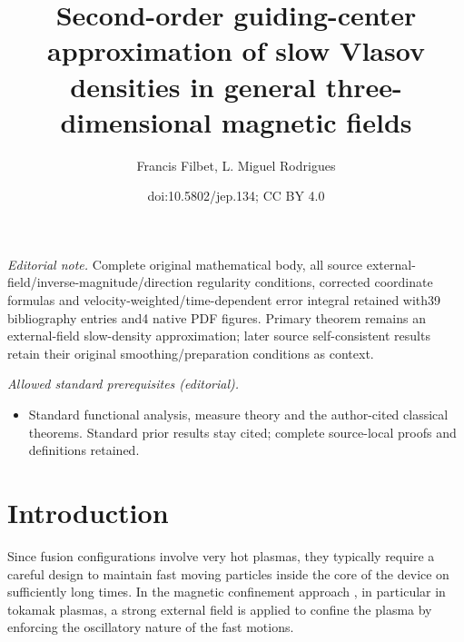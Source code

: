 \documentclass[10pt]{amsart}
\title{Second-order guiding-center approximation of slow Vlasov densities in general three-dimensional magnetic fields}
\author{Francis Filbet, L. Miguel Rodrigues}
\date{doi:10.5802/jep.134; CC BY 4.0}
\theoremstyle{plain}
\theoremstyle{definition}
\begin{document}
\maketitle
\noindent\textit{Editorial note.} Complete original mathematical body, all source external-field/inverse-magnitude/direction regularity conditions, corrected coordinate formulas and velocity-weighted/time-dependent error integral retained with39 bibliography entries and4 native PDF figures. Primary theorem remains an external-field slow-density approximation; later source self-consistent results retain their original smoothing/preparation conditions as context.\par\medskip
\noindent\textit{Allowed standard prerequisites (editorial).}\begin{itemize}
\item Standard functional analysis, measure theory and the author-cited classical theorems. Standard prior results stay cited; complete source-local proofs and definitions retained.
\end{itemize}\medskip
\vspace*{-1.1\baselineskip}\enlargethispage{.5\baselineskip}%
\tableofcontents


\section{Introduction}\label{s:introduction}

Since fusion configurations involve very hot plasmas, they typically
require a careful design to maintain fast moving particles inside the
core of the device on sufficiently long times. In the magnetic
confinement approach
\cite{bellan_2006_fundamentals,chen_introduction,freidberg2008plasma,haz_mei_03,miyamoto_2006_plasma,
piel2010plasma}, in particular in tokamak plasmas, a strong external
field is applied to confine the plasma by enforcing the oscillatory nature of the fast motions.
\end{document}
